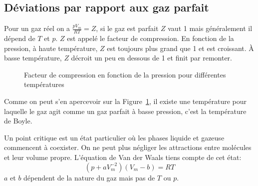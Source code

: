 \subsection{Déviations par rapport aux gaz parfait}
Pour un gaz réel on a $\frac{pV_m}{RT} = Z$,
si le gaz est parfait $Z$ vaut 1 mais généralement il dépend de $T$ et $p$.
$Z$ est appelé le facteur de compression.
En fonction de la pression, à haute température,
$Z$ est toujours plus grand que 1 et est croissant.
À basse température, $Z$ décroit un peu en dessous de 1 et finit par remonter.
\begin{figure}[h]
  \begin{center}
  \end{center}
  \caption{Facteur de compression en fonction
  de la pression pour différentes températures}
  \label{fig:fact_comp}
\end{figure}

Comme on peut s'en apercevoir sur la Figure~\ref{fig:fact_comp},
il existe une température pour laquelle le gaz agit comme un gaz parfait
à basse pression, c'est la température de Boyle.

Un point critique est un état particulier où les phases liquide et
gazeuse commencent à coexister.
On ne peut plus négliger les attractions entre molécules et leur volume propre.
L'équation de Van der Waals tiens compte de cet état:
\[ (p+aV_m^{-2})(V_m-b) = RT \]
$a$ et $b$ dépendent de la nature du gaz mais pas de $T$ ou $p$.

